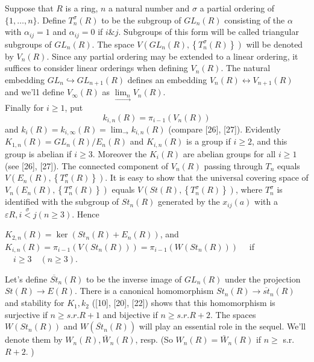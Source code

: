 Suppose that $R$ is a ring, $n$ a natural number and $\sigma$ a partial ordering of $\{1, \ldots, n\}$. Define $T_n^\sigma(R)$ to be the subgroup of $G L_n(R)$ consisting of the $\alpha$ with $\alpha_{i j}=1$ and $\alpha_{i j}=0$ if $i \& j$. Subgroups of this form will be called triangular subgroups of $G L_n(R)$. The space $V\left(G L_n(R),\left\{T_n^\sigma(R)\right\}\right)$ will be denoted by $V_n(R)$. Since any partial ordering may be extended to a linear ordering, it suffices to consider linear orderings when defining $V_n(R)$. The natural embedding $G L_n \hookrightarrow G L_{n+1}(R)$ defines an embedding $V_n(R) \longleftrightarrow V_{n+1}(R)$ and we'l1 define $V_{\infty}(R)$ as $\underset{\rightarrow}{\lim _n} V_n(R)$. \\
Finally for $i \geq 1$, put $$k_{i, n}(R)=\pi_{i-1}\left(V_n(R)\right)$$ and $k_i(R)=k_{i, \infty}(R)=\lim _{\rightarrow} k_{i, n}(R)$ (compare [26], [27]). Evidently $K_{1, n}(R)=G L_n(R) / E_n(R)$ and $K_{i, n}(R)$ is a group if $i \geq 2$, and this group is abelian if $i \geq 3$. Moreover the $K_i(R)$ are abelian groups for all $i \geq 1$ (see [26], [27]). The connected component of $V_n(R)$ passing through $T_n$ equals $V\left(E_n(R),\left\{T_n^\sigma(R)\right\}\right)$. It is easy to show that the universal covering space of $V_n\left(E_n(R),\left\{T_n^\sigma(R)\right\}\right)$ equals $V\left(S t(R),\left\{T_n^\sigma(R)\right\}\right)$, where $T_n^\sigma$ is identified with the subgroup of $S t_n(R)$ generated by the $x_{i j}(a)$ with a $\varepsilon R, i \stackrel{\sigma}{<} j(n \geq 3)$. Hence

\begin{lemm}
    $K_{2, n}(R)=\operatorname{ker}\left(S t_n(R)+E_n(R)\right)$, and $K_{i, n}(R)=\pi_{i-1}\left(V\left(S t_n(R)\right)\right)=\pi_{i-1}\left(W\left(S t_n(R)\right)\right) \quad$ if $\quad i \geq 3 \quad(n \geq 3)$.
\end{lemm}    

Let's define $\overline{S t}_n(R)$ to be the inverse image of $G L_n(R)$ under the projection $S t(R) \rightarrow E(R)$. There is a canonical homomorphism $S t_n(R) \rightarrow \overline{s t}_n(R)$ and stability for $K_1, k_2$ ([10], [20], [22]) shows that this homomorphism is surjective if $n \geq s . r . R+1$ and bijective if $n \geq s . r . R+2$. The spaces $W\left(S t_n(R)\right)$ and $W\left(\overline{S t}_n(R)\right)$ will play an essential role in the sequel. We'll denote them by $W_n(R), \bar{W}_n(R)$, resp. (So $W_n(R)=\bar{W}_n(R)$ if $n \geq$ s.r. $R+2$. )

